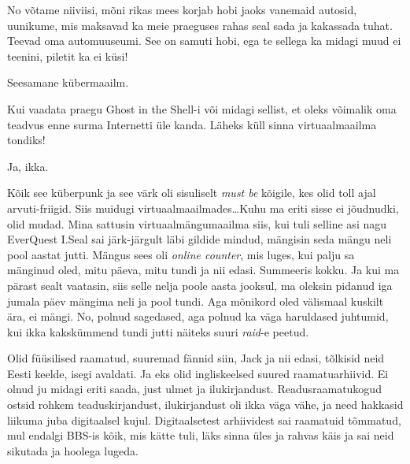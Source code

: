 
No võtame niiviisi, mõni rikas mees korjab hobi jaoks vanemaid autosid, uunikume, mis maksavad ka meie praeguses rahas seal sada ja kakassada tuhat. Teevad oma automuuseumi. See on samuti hobi, ega te sellega ka midagi muud ei teenini, piletit ka ei küsi!
       
Seesamane kübermaailm. 

Kui vaadata praegu Ghost in the Shell-i või midagi sellist, et oleks võimalik oma teadvus enne surma Internetti üle kanda. Läheks küll sinna virtuaalmaailma tondiks!  

Ja, ikka.

                 
Kõik see küberpunk ja see värk oli sisuliselt \emph{must be} kõigile, kes olid toll ajal arvuti-friigid. Siis muidugi virtuaalmaailmades\ldots Kuhu ma eriti sisse ei jõudnudki, olid mudad. Mina sattusin virtuaalmängumaailma siis, kui tuli selline asi nagu EverQuest I.Seal sai järk-järgult läbi gildide mindud, mängisin seda mängu neli pool aastat jutti. Mängus sees oli \emph{online counter}, mis luges, kui palju sa mänginud oled, mitu päeva, mitu tundi ja nii edasi. Summeeris kokku. Ja kui ma pärast sealt vaatasin, siis selle nelja poole aasta jooksul, ma oleksin pidanud iga jumala päev mängima neli ja pool tundi. Aga mõnikord oled välismaal kuskilt ära, ei mängi. No, polnud sagedased, aga polnud ka väga haruldased juhtumid, kui ikka kakskümmend tundi jutti näiteks suuri \emph{raid}-e peetud.
                 

Olid füüsilised raamatud, suuremad fännid siin, Jack ja nii edasi, tõlkisid neid Eesti keelde,  isegi avaldati. Ja eks olid ingliskeelsed suured raamatuarhiivid. Ei olnud ju midagi eriti saada, just ulmet ja ilukirjandust. Readusraamatukogud  ostsid rohkem teaduskirjandust,  ilukirjandust oli ikka väga vähe, ja need hakkasid liikuma juba digitaalsel kujul. Digitaalsetest arhiividest sai raamatuid tõmmatud, mul endalgi BBS-is kõik, mis kätte tuli, läks sinna üles ja rahvas käis ja sai neid sikutada ja hoolega lugeda. 

